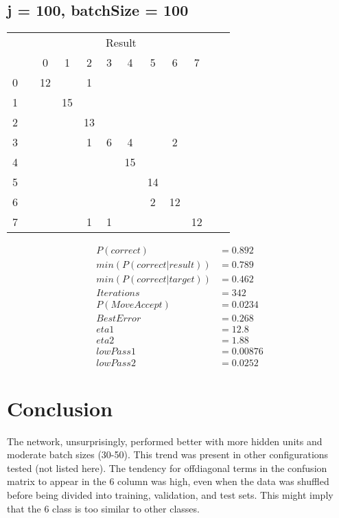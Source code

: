 \documentclass[10pt, conference, compsocconf]{IEEEtran}
\begin{document}
\subsection{j = 100, batchSize = 100}
\begin{center}
\begin{tabular}{l*{10}{c}r}
& & & & & \multicolumn{2}{c}{Result}  & & \\
 &\vline& 0 & 1 & 2 & 3 & 4 & 5 & 6 & 7 \\
\hline
0 &\vline&   12&    &   1&    &    &    &    &   \\
 1 &\vline&     &  15&    &    &    &    &    &   \\
 2 &\vline&     &    &  13&    &    &    &    &   \\
 3 &\vline&     &    &   1&   6&   4&    &   2&   \\
 4 &\vline&     &    &    &    &  15&    &    &   \\
 5 &\vline&     &    &    &    &    &  14&    &   \\
 6 &\vline&     &    &    &    &    &   2&  12&   \\
 7 &\vline&     &    &   1&   1&    &    &    &  12\\
\end{tabular}
\begin{align}
P( correct )  &=   0.892\\
min( P( correct |  result  ) )  &=   0.789\\
min( P( correct | target ) )  &=   0.462\\
Iterations &=   342\\
P(Move Accept) &=   0.0234\\
Best Error &=   0.268\\
eta1      &=  12.8\\
eta2     &=   1.88\\
lowPass1  &=  0.00876\\
lowPass2  &=  0.0252
\end{align}
\end{center}




\section{Conclusion}
The network, unsurprisingly, performed better with more hidden units and moderate batch sizes (30-50). This trend was present in other configurations tested (not listed here). The tendency for offdiagonal terms in the confusion matrix to appear in the 6 column was high, even when the data was shuffled before being divided into training, validation, and test sets. This might imply that the 6 class is too similar to other classes.
\end{document}
